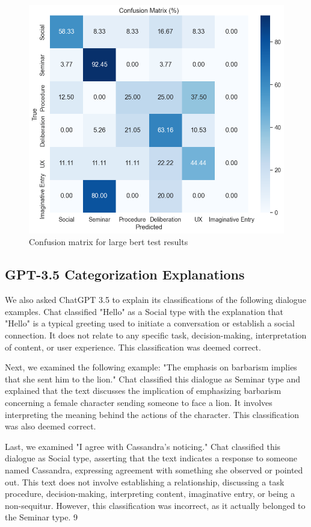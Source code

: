 \documentclass[fleqn,moreauthors,10pt]{ds_report}
\begin{document}
\begin{figure}[ht]\centering
	\includegraphics[width=\linewidth]{report/fig/confusion_matrix_HPC.png}
    \caption{Confusion matrix for large bert test results}
	\label{fig:column}
\end{figure}

\subsection*{GPT-3.5 Categorization Explanations}
We also asked ChatGPT 3.5 to explain its classifications of the following dialogue examples. Chat classified "Hello" as a Social type with the explanation that "Hello" is a typical greeting used to initiate a conversation or establish a social connection. It does not relate to any specific task, decision-making, interpretation of content, or user experience. This classification was deemed correct.

Next, we examined the following example: "The emphasis on barbarism implies that she sent him to the lion." Chat classified this dialogue as Seminar type and explained that the text discusses the implication of emphasizing barbarism concerning a female character sending someone to face a lion. It involves interpreting the meaning behind the actions of the character. This classification was also deemed correct.

Last, we examined "I agree with Cassandra's noticing." Chat classified this dialogue as Social type, asserting that the text indicates a response to someone named Cassandra, expressing agreement with something she observed or pointed out. This text does not involve establishing a relationship, discussing a task procedure, decision-making, interpreting content, imaginative entry, or being a non-sequitur. However, this classification was incorrect, as it actually belonged to the Seminar type.
9
\end{document}
